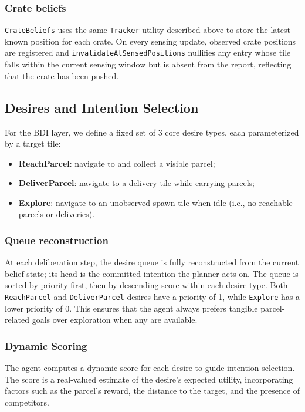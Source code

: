\subsubsection{Crate beliefs}
\texttt{CrateBeliefs} uses the same \texttt{Tracker} utility described above to store the latest known position for each crate.
On every sensing update, observed crate positions are registered and \texttt{invalidateAtSensedPositions} nullifies any entry whose tile falls within
the current sensing window but is absent from the report, reflecting that the crate has been pushed.

\subsection{Desires and Intention Selection}
\label{sec:desires}
For the BDI layer, we define a fixed set of 3 core desire types, each parameterized by a target tile:
\begin{itemize}
    \item \textbf{ReachParcel}: navigate to and collect a visible parcel;
    \item \textbf{DeliverParcel}: navigate to a delivery tile while carrying parcels;
    \item \textbf{Explore}: navigate to an unobserved spawn tile when idle (i.e., no reachable parcels or deliveries).
\end{itemize}

\subsubsection{Queue reconstruction}
At each deliberation step, the desire queue is fully reconstructed from the current belief state; its head is the committed intention the planner acts on.
The queue is sorted by priority first, then by descending score within each desire type.
Both \texttt{ReachParcel} and \texttt{DeliverParcel} desires have a priority of 1, while \texttt{Explore} has a lower priority of 0.
This ensures that the agent always prefers tangible parcel-related goals over exploration when any are available.

\subsubsection{Dynamic Scoring}
The agent computes a dynamic score for each desire to guide intention selection.
The score is a real-valued estimate of the desire's expected utility, incorporating factors such as the parcel's reward, the distance to the target, and the presence of competitors.

